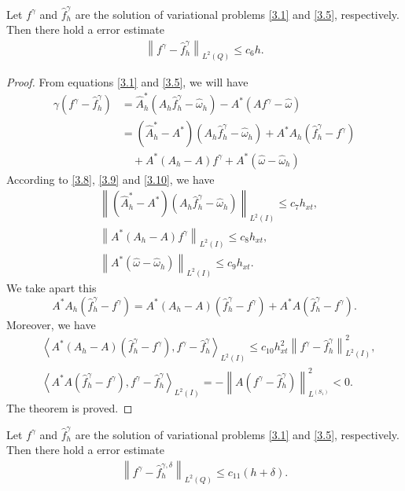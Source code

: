 \documentclass[]{article}
\begin{document}
\begin{dl}\label{dl3.3}
	Let $f^\gamma$ and $\hat{f}^\gamma_h$ are the solution of variational problems \eqref{3.1} and \eqref{3.5}, respectively. Then there hold a error estimate
	\begin{align}\label{3.17}
	\left\|f^\gamma-\hat{f}^\gamma_h \right\|_{L^2(Q)}\leq c_6h.
	\end{align}
\end{dl}
\begin{proof} From equations \eqref{3.1} and \eqref{3.5}, we will have
	\begin{align*}
		\gamma \left(f^\gamma-\hat{f}^\gamma_h\right)&=\hat{A}^*_h\left(A_h\hat{f}^\gamma_h-\hat{\omega}_h\right)-A^*\left(Af^\gamma-\hat{\omega}\right)\\
		&=\left(\hat{A}^*_h-A^*\right)\left(A_h\hat{f}^\gamma_h-\hat{\omega}_h\right)+A^*A_h\left(\hat{f}^\gamma_h-f^\gamma\right)\\
		&\quad+A^*\left(A_h-A\right)f^\gamma+A^*\left(\hat{\omega}-\hat{\omega}_h\right)
	\end{align*}
	According to \eqref{3.8}, \eqref{3.9} and \eqref{3.10}, we have
	\begin{align*}
		&\left\| \left(\hat{A}^*_h-A^*\right)\left(A_h\hat{f}^\gamma_h-\hat{\omega}_h\right)\right\|_{L^2(I)}\leq c_7h_{xt},\\
		&\left\| A^*\left(A_h-A\right)f^\gamma\right\|_{L^2(I)}\leq c_8h_{xt},\\
		&\left\|A^*\left(\hat{\omega}-\hat{\omega}_h\right) \right\|_{L^2(I)}\leq c_9h_{xt}.
	\end{align*}
	We take apart this
	$$A^*A_h\left(\hat{f}^\gamma_h-f^\gamma\right)=A^*\left(A_h-A\right)\left(\hat{f}^\gamma_h-f^\gamma\right)+A^*A\left(\hat{f}^\gamma_h-f^\gamma\right).$$
	Moreover, we have
	\begin{align*}
		&\left\langle A^*\left(A_h-A\right)\left(\hat{f}^\gamma_h-f^\gamma\right), f^\gamma-\hat{f}^\gamma_h\right\rangle_{L^2(I)}\leq c_{10}h_{xt}^2\left\| f^\gamma-\hat{f}^\gamma_h\right\|^2_{L^2(I)},\\
		&\left\langle A^*A\left(\hat{f}^\gamma_h-f^\gamma\right), f^\gamma-\hat{f}^\gamma_h\right\rangle_{L^2(I)}=-\left\|A\left(f^\gamma-\hat{f}^\gamma_h\right) \right\|^2_{L^(S_1)}<0.
	\end{align*}
	The theorem is proved.
\end{proof}
\begin{cy}\label{cy3.1}
	Let $f^\gamma$ and $\hat{f}^\gamma_h$ are the solution of variational problems \eqref{3.1} and \eqref{3.5}, respectively. Then there hold a error estimate
	\begin{align}\label{3.12}
		\left\|f^\gamma-\hat{f}^{\gamma, \delta}_h \right\|_{L^2(Q)}\leq c_{11}(h+\delta).
	\end{align}
\end{cy}
\end{document}
